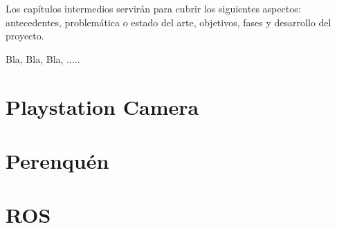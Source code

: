 
Los capítulos intermedios servirán para cubrir los siguientes aspectos:
antecedentes, problemática o estado del arte, objetivos, fases y desarrollo del proyecto.

Bla, Bla, Bla, .....


\section{Playstation Camera}
\label{3:sec1}


\section{Perenquén}
\label{3:sec2}



\section{ROS}
\label{3:sec3}

